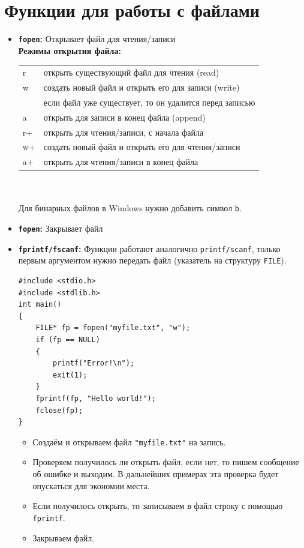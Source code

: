 \documentclass{article}
\begin{document}
\section*{Функции для работы с файлами}
\begin{itemize}
\item \textbf{\texttt{fopen}:} Открывает файл для чтения/записи\\
\textbf{Режимы открытия файла:} \\
\begin{tabular}{ | l || l |}
\hline
  r & открыть существующий файл для чтения (read)\\
  w & создать новый файл и открыть его для записи (write)\\
    & если файл уже существует, то он удалится перед записью\\
  a & открыть для записи в конец файла (append)\\
  r+ & открыть для чтения/записи, с начала файла  \\
  w+ & создать новый файл и открыть его для чтения/записи \\
  a+ & открыть для чтения/записи в конец файла \\
\hline
\end{tabular}\\\\
Для бинарных файлов в Windows нужно добавить символ \texttt{b}.
\item \textbf{\texttt{fopen}:} Закрывает файл
\item \textbf{\texttt{fprintf/fscanf}:} Функции работают аналогично \texttt{printf/scanf}, только первым аргументом нужно передать файл (указатель на структуру \texttt{FILE}).
\begin{lstlisting}
#include <stdio.h>
#include <stdlib.h>
int main()
{
    FILE* fp = fopen("myfile.txt", "w");
    if (fp == NULL)
    {
        printf("Error!\n");
        exit(1);
    }
    fprintf(fp, "Hello world!");
    fclose(fp);
}
\end{lstlisting}
\begin{itemize}
\item Создаём и открываем файл \texttt{"myfile.txt"} на запись.
\item Проверяем получилось ли открыть файл, если нет, то пишем сообщение об ошибке и выходим.  В дальнейших примерах эта проверка будет опускаться для экономии места.
\item Если получилось открыть, то записываем в файл строку с помощью \texttt{fprintf}.
\item Закрываем файл.
\end{itemize}
 

\end{itemize}
\end{document}
